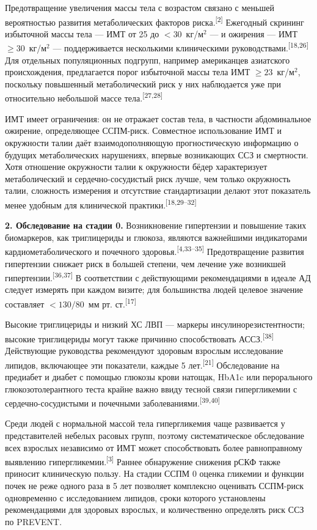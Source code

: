 \documentclass[11pt,a4paper]{article}
\newcommand{\src}[1]{\textsuperscript{[#1]}}
\begin{document}
Предотвращение увеличения массы тела с возрастом связано с меньшей вероятностью развития метаболических факторов риска.\src{2} Ежегодный скрининг избыточной массы тела --- ИМТ от 25 до $<30$~кг/м$^2$ --- и ожирения --- ИМТ $\geq30$~кг/м$^2$ --- поддерживается несколькими клиническими руководствами.\src{18,26} Для отдельных популяционных подгрупп, например американцев азиатского происхождения, предлагается порог избыточной массы тела ИМТ $\geq23$~кг/м$^2$, поскольку повышенный метаболический риск у них наблюдается уже при относительно небольшой массе тела.\src{27,28}

ИМТ имеет ограничения: он не отражает состав тела, в частности абдоминальное ожирение, определяющее ССПМ-риск. Совместное использование ИМТ и окружности талии даёт взаимодополняющую прогностическую информацию о будущих метаболических нарушениях, впервые возникающих ССЗ и смертности. Хотя отношение окружности талии к окружности бёдер характеризует метаболический и сердечно-сосудистый риск лучше, чем только окружность талии, сложность измерения и отсутствие стандартизации делают этот показатель менее удобным для клинической практики.\src{18,29--32}

\textbf{2. Обследование на стадии 0.} Возникновение гипертензии и повышение таких биомаркеров, как триглицериды и глюкоза, являются важнейшими индикаторами кардиометаболического и почечного здоровья.\src{4,33--35} Предотвращение развития гипертензии снижает риск в большей степени, чем лечение уже возникшей гипертензии.\src{36,37} В соответствии с действующими рекомендациями в идеале АД следует измерять при каждом визите; для большинства людей целевое значение составляет $<130/80$~мм рт. ст.\src{17}

Высокие триглицериды и низкий ХС ЛВП --- маркеры инсулинорезистентности; высокие триглицериды могут также причинно способствовать АССЗ.\src{38} Действующие руководства рекомендуют здоровым взрослым исследование липидов, включающее эти показатели, каждые 5 лет.\src{21} Обследование на предиабет и диабет с помощью глюкозы крови натощак, HbA1c или перорального глюкозотолерантного теста крайне важно ввиду тесной связи гипергликемии с сердечно-сосудистыми и почечными заболеваниями.\src{39,40}

Среди людей с нормальной массой тела гипергликемия чаще развивается у представителей небелых расовых групп, поэтому систематическое обследование всех взрослых независимо от ИМТ может способствовать более равноправному выявлению гипергликемии.\src{3} Раннее обнаружение снижения рСКФ также приносит клиническую пользу. На стадии ССПМ 0 оценка гликемии и функции почек не реже одного раза в 5 лет позволяет комплексно оценивать ССПМ-риск одновременно с исследованием липидов, сроки которого установлены рекомендациями для здоровых взрослых, и количественно определять риск ССЗ по PREVENT.
\end{document}
